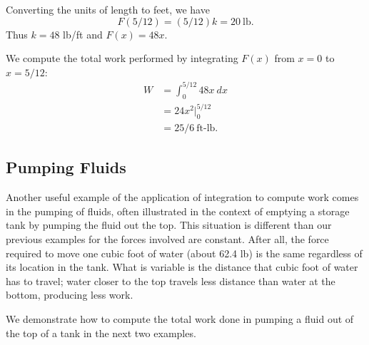 \begin{example}
Converting the units of length to feet, we have
\[F(5/12) = (5/12)k = 20\ \text{lb}.\]
Thus $k = 48$ lb/ft and $F(x) = 48x$. 

We compute the total work performed by integrating $F(x)$ from $x=0$ to $x=5/12$:
\begin{align*}
	W
	&= 	\int_0^{5/12} 48x \ dx \\
	&=	24x^2\Big|_0^{5/12} \\
	&=  25/6 %
	\ \text{ft-lb.}
\end{align*}
\end{example}

\subsection{Pumping Fluids}


Another useful example of the application of integration to compute work comes in the pumping of fluids, often illustrated in the context of emptying a storage tank by pumping the fluid out the top. This situation is different than our previous examples for the forces involved are constant. After all, the force required to move one cubic foot of water (about 62.4 lb) is the same regardless of its location in the tank. What is variable is the distance that cubic foot of water has to travel; water closer to the top travels less distance than water at the bottom, producing less work.

We demonstrate how to compute the total work done in pumping a fluid out of the top of a tank in the next two examples.

